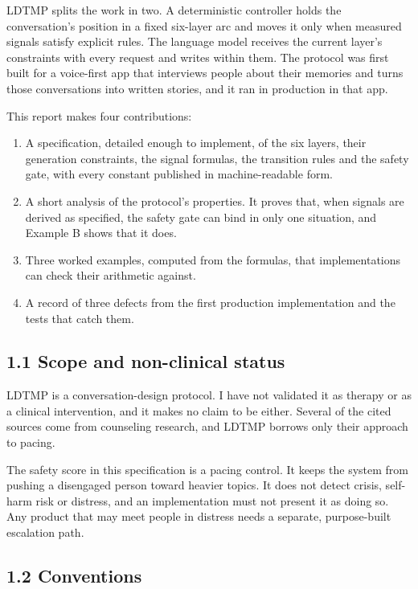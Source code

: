 \documentclass[11pt]{article}
\providecommand{\tightlist}{\setlength{\itemsep}{0pt}\setlength{\parskip}{0pt}}
\begin{document}
LDTMP splits the work in two. A deterministic controller holds the
conversation's position in a fixed six-layer arc and moves it only when
measured signals satisfy explicit rules. The language model receives the
current layer's constraints with every request and writes within them.
The protocol was first built for a voice-first app that interviews
people about their memories and turns those conversations into written
stories, and it ran in production in that app.

This report makes four contributions:

\begin{enumerate}
\def\labelenumi{\arabic{enumi}.}
\tightlist
\item
  A specification, detailed enough to implement, of the six layers,
  their generation constraints, the signal formulas, the transition
  rules and the safety gate, with every constant published in
  machine-readable form.
\item
  A short analysis of the protocol's properties. It proves that, when
  signals are derived as specified, the safety gate can bind in only one
  situation, and Example B shows that it does.
\item
  Three worked examples, computed from the formulas, that
  implementations can check their arithmetic against.
\item
  A record of three defects from the first production implementation and
  the tests that catch them.
\end{enumerate}

\subsection{1.1 Scope and non-clinical status}

LDTMP is a conversation-design protocol. I have not validated it as
therapy or as a clinical intervention, and it makes no claim to be
either. Several of the cited sources come from counseling research, and
LDTMP borrows only their approach to pacing.

The safety score in this specification is a pacing control. It keeps the
system from pushing a disengaged person toward heavier topics. It does
not detect crisis, self-harm risk or distress, and an implementation
must not present it as doing so. Any product that may meet people in
distress needs a separate, purpose-built escalation path.

\subsection{1.2 Conventions}
\end{document}
